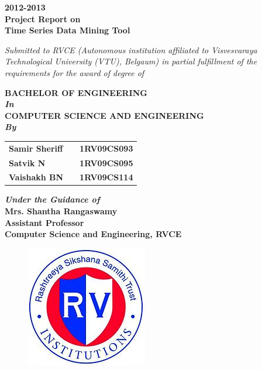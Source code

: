\documentclass[12pt,a4paper]{report}
\begin{document}
\begin{center}
\vspace{-10mm}
\textbf{2012-2013}\\
\textbf{\large{Project Report on}}\\
\textbf{\Large{Time Series Data Mining Tool}}\\


\begin{center}
\vspace{5mm}
\textit{Submitted to RVCE (Autonomous institution affiliated to Visvesvaraya Technological University (VTU), Belgaum) in partial fulfillment of the requirements for the award of degree of}\\
\vspace{1mm}
\begin{center}
\textbf{\large{BACHELOR OF ENGINEERING}}\\
\textit{\textbf{\large{In}}}\\
\textbf{\large{COMPUTER SCIENCE AND ENGINEERING}}\\
\textit{\textbf{\large{By}}}\\
\end{center}

\begin{tabular}{l c r}

\textbf{\large{Samir Sheriff}} & \hspace{50mm} & \textbf{\large{1RV09CS093}}\\
\textbf{\large{Satvik N}} & \hspace{50mm} & \textbf{\large{1RV09CS095}}\\
\textbf{\large{Vaishakh BN}} & \hspace{50mm} & \textbf{\large{1RV09CS114}}\\

\end{tabular}
\end{center}
\vspace{1mm}
\textbf{\textit{Under the Guidance of}}\\
\textbf{Mrs. Shantha Rangaswamy}\\
\textbf{Assistant Professor}\\
\textbf{Computer Science and Engineering, RVCE}\\
\end{center}
\begin{figure} [h]
	\centering
	\includegraphics[scale=0.5]{RV.jpg}
\end{figure}
\end{document}
